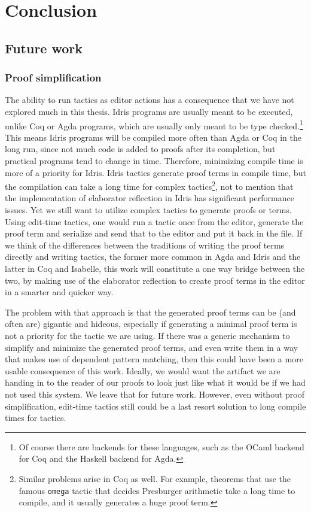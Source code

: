 \chapter{Conclusion}\label{chap:conclusion}

\section{Future work}

\subsection{Proof simplification}

The ability to run tactics as editor actions has a consequence
that we have not explored much in this thesis.
Idris programs are usually meant to be executed, unlike Coq or
Agda programs, which are usually only meant to be type checked.\footnote{Of
  course there are backends for these languages, such as the OCaml
  backend for Coq and the Haskell backend for Agda.}
This means Idris programs will be compiled more often than Agda or Coq in the
long run, since not much code is added to proofs after its completion, but
practical programs tend to change in time. Therefore, minimizing compile time
is more of a priority for Idris.
Idris tactics generate proof terms in compile time, but the
compilation can take a long time for complex tactics\footnote{Similar problems
arise in Coq as well. For example, theorems that use the famous \texttt{omega}
tactic that decides Presburger arithmetic\cite{omega} take a long time to compile, and it
usually generates a huge proof term.},
not to mention that the implementation of elaborator
reflection in Idris has significant performance issues.\cite{leanmeta}
Yet we still want to utilize complex tactics to generate proofs or terms.
Using edit-time tactics, one would run a tactic once from the editor, generate
the proof term and serialize and send that to the editor and put it back in the
file.
If we think of the differences between the traditions of writing the proof
terms directly and writing tactics, the former more common in Agda and Idris
and the latter in Coq and Isabelle, this work will constitute a one way bridge
between the two, by making use of the elaborator reflection to create proof
terms in the editor in a smarter and quicker way.

The problem with that approach is that the generated proof terms can be (and
often are) gigantic and hideous, especially if generating a minimal proof term
is not a priority for the tactic we are using.
If there was a generic mechanism to simplify and minimize the generated proof
terms, and even write them in a way that makes use of dependent pattern
matching, then this could have been a more usable consequence of this work.
Ideally, we would want the artifact we are handing in to the reader of our
proofs to look just like what it would be if we had not used this system.
We leave that for future work.  However, even without proof simplification,
edit-time tactics still could be a last resort solution to long compile times
for tactics.

